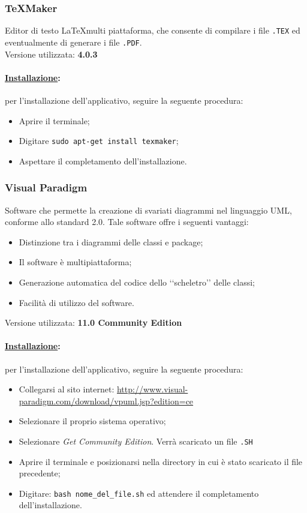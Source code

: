 \subsubsection{\TeX Maker}
\label{texmaker}
Editor di testo \LaTeX multi piattaforma, che consente di compilare i file \verb!.TEX! ed eventualmente di generare i file \verb!.PDF!.\\ 
Versione utilizzata: \textbf{4.0.3}

\paragraph{\underline{Installazione}:} per l'installazione dell'applicativo, seguire la seguente procedura:
\begin{itemize}
\item Aprire il terminale;
\item Digitare \verb!sudo apt-get install texmaker!;
\item Aspettare il completamento dell'installazione.
\end{itemize}

\subsubsection{Visual Paradigm}
\label{visualparadigm}
Software che permette la creazione di svariati diagrammi nel linguaggio UML, conforme allo standard 2.0. Tale software offre i seguenti vantaggi:
\begin{itemize}
	\item Distinzione tra i diagrammi delle classi e package\glossario{};
	\item Il software è multipiattaforma;
	\item Generazione automatica del codice dello \lq\lq{}scheletro\rq\rq{} delle classi;
	\item Facilità di utilizzo del software.
\end{itemize}
Versione utilizzata: \textbf{11.0 Community Edition}

\paragraph{\underline{Installazione}:} per l'installazione dell'applicativo, seguire la seguente procedura:
\begin{itemize}
\item Collegarsi al sito internet: \url{http://www.visual-paradigm.com/download/vpuml.jsp?edition=ce}
\item Selezionare il proprio sistema operativo;
\item Selezionare \textit{Get Community Edition}. Verrà scaricato un file \verb!.SH!
\item Aprire il terminale e posizionarsi nella directory in cui è stato scaricato il file precedente;
\item Digitare: \verb!bash nome_del_file.sh! ed attendere il completamento dell'installazione.
\end{itemize}

